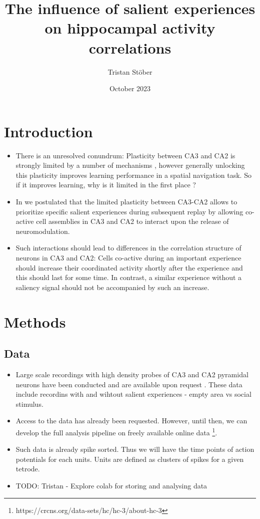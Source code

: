 \documentclass[a4paper]{article}
\title{The influence of salient experiences on hippocampal activity correlations}
\author{Tristan Stöber}
\date{October 2023}
\begin{document}
\maketitle

\section{Introduction}
\begin{itemize}
    \item There is an unresolved conundrum: Plasticity between CA3 and CA2 is strongly limited by a number of mechanisms \citep{zhao2007synaptic, lee2010rgs14, carstens2016perineuronal}, however generally unlocking this plasticity improves learning performance in a spatial navigation task\citep{lee2010rgs14}. So if it improves learning, why is it limited in the first place \citep{lehr2021ca2}?
    \item In \cite{stober2020selective} we postulated that the limited plasticity between CA3-CA2 allows to prioritize specific salient experiences during subsequent replay by allowing co-active cell assemblies in CA3 and CA2 to interact upon the release of neuromodulation.
    \item Such interactions should lead to differences in the correlation structure of neurons in CA3 and CA2: Cells co-active during an important experience should increase their coordinated activity shortly after the experience and this should last for some time. In contrast, a similar experience without a saliency signal should not be accompanied by such an increase.
    \end{itemize}

\section{Methods}
\subsection{Data}
\begin{itemize}
    \item Large scale recordings with high density probes of CA3 and CA2 pyramidal neurons have been conducted and are available upon request \citep{oliva2020hippocampal}. These data include recordins with and wihtout salient experiences - empty area vs social stimulus.
    \item Access to the data has already been requested. However, until then, we can develop the full analysis pipeline on freely available online data \citep{mizuseki2014neurosharing}\footnote{https://crcns.org/data-sets/hc/hc-3/about-hc-3}.
    \item Such data is already spike sorted. Thus we will have the time points of action potentials for each units. Units are defined as clusters of spikes for a given tetrode.
    \item TODO: Tristan - Explore colab for storing and analysing data
\end{itemize} 
\end{document}
